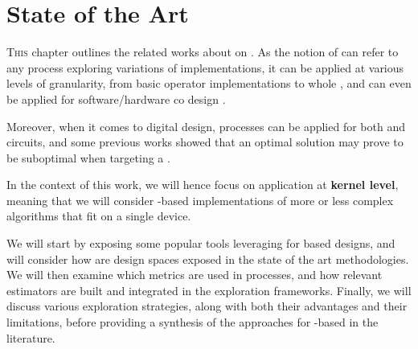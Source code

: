 \chapter{State of the Art}


\lettrine[lines=2]{T}{his} chapter outlines the related works about  on .
As the notion of  can refer to any process exploring variations of implementations, it can be applied at various levels of granularity, from basic operator implementations \cite{rehman_architectural-space_2016}\cite{geng_high-speed_2021} to whole  \cite{ascia_ga-based_2004}\cite{calborean_automatic_2010}, and can even be applied for software/hardware co design \cite{barone_multi-objective_2021}.

Moreover, when it comes to digital design,  processes can be applied for both  and  circuits, and some previous works showed that an optimal  solution may prove to be suboptimal when targeting a  \cite{liu2019accelerating}.

In the context of this work, we will hence focus on  application at {\bf kernel level}, meaning that we will consider -based implementations of more or less complex algorithms that fit on a single  device.

We will start by exposing some popular tools leveraging  for  based designs, and will consider how are design spaces exposed in the state of the art methodologies.
We will then examine which metrics are used in  processes, and how relevant estimators are built and integrated in the exploration frameworks.
Finally, we will discuss various exploration strategies, along with both their advantages and their limitations, before providing a synthesis of the approaches for -based  in the literature.

\clearpage
\vspace*{\fill}
\minitoc 
\vspace*{\fill}

